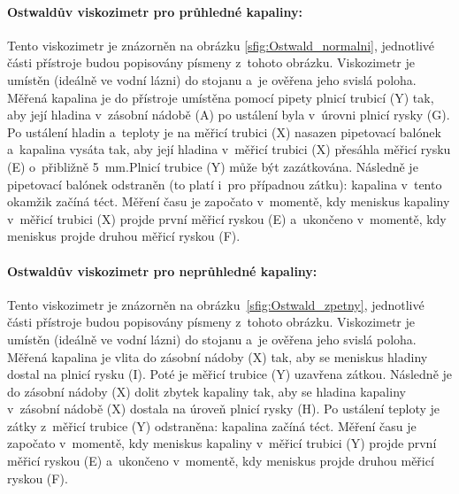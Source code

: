 \documentclass[12pt]{article}
\begin{document}
\paragraph{Ostwaldův viskozimetr pro průhledné kapaliny:}
Tento viskozimetr je znázorněn na obrázku \ref{sfig:Ostwald_normalni}, jednotlivé části přístroje budou popisovány písmeny z~tohoto obrázku. Viskozimetr je umístěn (ideálně ve vodní lázni) do stojanu a~je ověřena jeho svislá poloha. Měřená kapalina je do přístroje umístěna pomocí pipety plnicí trubicí (Y) tak, aby její hladina v~zásobní nádobě (A) po ustálení byla v~úrovni plnicí rysky (G). Po ustálení hladin a~teploty je na měřicí trubici (X) nasazen pipetovací balónek a~kapalina vysáta tak, aby její hladina v~měřicí trubici (X) přesáhla měřicí rysku (E) o~přibližně \SI{5}{\milli\metre}.\footnotemark Plnicí trubice (Y) může být zazátkována. Následně je pipetovací balónek odstraněn (to platí i~pro případnou zátku): kapalina v~tento okamžik začíná téct. Měření času je započato v~momentě, kdy meniskus kapaliny v~měřicí trubici (X) projde první měřicí ryskou (E) a~ukončeno v~momentě, kdy meniskus projde druhou měřicí ryskou (F).~\cite{book:Calibration_of_viscometers}

\paragraph{Ostwaldův viskozimetr pro neprůhledné kapaliny:}
\label{sec:zpetny_ostwald}
Tento viskozimetr je znázorněn na obrázku~\ref{sfig:Ostwald_zpetny}, jednotlivé části přístroje budou popisovány písmeny z~tohoto obrázku. Viskozimetr je umístěn (ideálně ve vodní lázni) do stojanu a~je ověřena jeho svislá poloha. Měřená kapalina je vlita do zásobní nádoby (X) tak, aby se meniskus hladiny dostal na plnicí rysku (I). Poté je měřicí trubice (Y) uzavřena zátkou. Následně je do zásobní nádoby (X) dolit zbytek kapaliny tak, aby se hladina kapaliny v~zásobní nádobě (X) dostala na úroveň plnicí rysky (H). Po ustálení teploty je zátky z~měřicí trubice (Y) odstraněna: kapalina začíná téct. Měření času je započato v~momentě, kdy meniskus kapaliny v~měřicí trubici (Y) projde první měřicí ryskou (E) a~ukončeno v~momentě, kdy meniskus projde druhou měřicí ryskou (F).~\cite{book:Calibration_of_viscometers}
\end{document}
